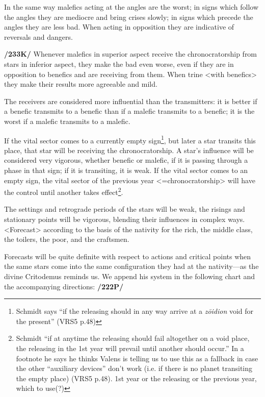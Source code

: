 In the same way malefics acting at the angles are the worst; in signs which follow the angles they are mediocre and bring crises slowly; in signs which precede the angles they are less bad. When acting in opposition they are indicative of reversals and dangers.

\textbf{/233K/} Whenever malefics in superior aspect receive the chronocratorship from stars in inferior aspect, they make the bad even worse, even if they are in opposition to benefics and are receiving from them. When trine <with benefics> they make their results more agreeable and mild. 

The \mndl receivers are considered more influential than the transmitters: it is better if a benefic transmits to a benefic than if a malefic transmits to a benefic; it is the worst if a malefic transmits to a malefic. 

If the vital sector comes to a currently empty sign\footnote{Schmidt says ``if the releasing should in any way arrive at a \textsl{z\={o}idion} void for the present'' (VRS5 p.48)}, but later a star transits this place, that star will be receiving the chronocratorship. A
star’s influence will be considered very vigorous, whether benefic or malefic, if it is passing through a phase in that sign; if it is transiting, it is weak. If the vital sector comes to an empty sign, the vital sector of the previous year <=chronocratorship> will have the control until another takes effect\footnote{Schmidt ``if at anytime the releasing should fail altogether on a void place, the releasing in the 1st year will prevail until another should occur.'' In a footnote he says he thinks Valens is telling us to use this as a fallback in case the other ``auxiliary devices'' don't work (i.e. if there is no planet transiting the empty place) (VRS5 p.48). 1st year or the releasing or the previous year, which to use(?)}.

 
The settings and retrograde periods of the stars will be weak, the risings and stationary points will be vigorous, blending their influences in complex ways. <Forecast> according to the basis of the nativity for the rich, the middle class, the toilers, the poor, and the craftsmen.

 
Forecasts will be quite definite with respect to actions and critical points when the same stars come into the same configuration they had at the nativity—as the divine Critodemus reminds us. We append his system in the following chart and the accompanying directions: \textbf{/222P/}


